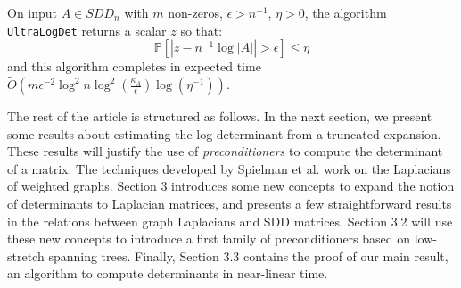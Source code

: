 \begin{theorem}\label{thm:ultra_main}On input $A\in SDD_{n}$ with
$m$ non-zeros, $\epsilon>n^{-1}$, $\eta>0$, the algorithm \texttt{UltraLogDet}
returns a scalar $z$ so that:
\[
\mathbb{P}\left[\left|z-n^{-1}\log\left|A\right|\right|>\epsilon\right]\leq\eta
\]
and this algorithm completes in expected time $\tilde{O}\left(m\epsilon^{-2}\log^{2}n\log^{2}\left(\frac{\kappa_A}{\epsilon}\right)\log\left(\eta^{-1}\right)\right)$.

\end{theorem}

The rest of the article is structured as follows. In the next section,
we present some results about estimating the log-determinant from
a truncated expansion. These results will justify the use of \emph{preconditioners
}to compute the determinant of a matrix. The techniques developed
by Spielman et al. work on the Laplacians of weighted graphs. Section
3 introduces some new concepts to expand the notion of determinants
to Laplacian matrices, and presents a few straightforward results
in the relations between graph Laplacians and SDD matrices. Section
3.2 will use these new concepts to introduce a first family of preconditioners
based on low-stretch spanning trees. Finally, Section 3.3 contains
the proof of our main result, an algorithm to compute determinants
in near-linear time.
